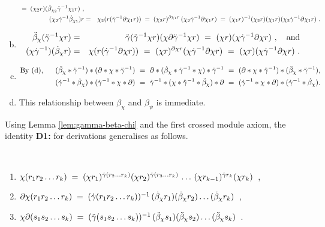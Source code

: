 \begin{pf}
\begin{enumerate}[(a)]
\begin{eqnarray*}
    \;=\; (\chi_2 r)(\ddot{\beta}_{\chi_2} \ddot{\gamma}^{-1} \chi_1 r)~, \\ 
(\chi_2 \dot{\gamma}^{-1} \dot{\beta}_{\chi_1})r
  & = & 
    \chi_2(r(\dot{\gamma}^{-1} \partial \chi_1 r))
  \;=\; (\chi_2 r)^{\partial\chi_1 r}\,(\chi_2 \dot{\gamma}^{-1} \partial \chi_1 r)
  \;=\; (\chi_1 r)^{-1}(\chi_2 r)(\chi_1 r)(\chi_2\dot{\gamma}^{-1}\partial\chi_1 r)~. 
\end{eqnarray*} 
\item
\mbox{}\vspace*{-9mm} 
\begin{eqnarray*}
\ddot{\beta}_{\chi}(\ddot{\gamma}^{-1}\chi r)
  &=& \ddot{\gamma}(\ddot{\gamma}^{-1}\chi r)(\chi\partial\ddot{\gamma}^{-1}\chi r) 
     ~=~ (\chi r)(\chi\dot{\gamma}^{-1}\partial\chi r)~, \quad \text{and} \\
(\chi\dot{\gamma}^{-1})(\dot{\beta}_{\chi}r) 
  &=& \chi(r(\dot{\gamma}^{-1}\partial\chi r)) 
     ~=~ (\chi r)^{\partial\chi r}(\chi\dot{\gamma}^{-1}\partial\chi r) 
     ~=~ (\chi r)(\chi\dot{\gamma}^{-1}\partial\chi r)~. 
\end{eqnarray*} 
\item
\mbox{}\vspace*{-9mm} 
\begin{eqnarray*} 
\text{By (d)},~~ 
  &&     (\ddot{\beta}_{\chi} * \ddot{\gamma}^{-1}) * (\partial * \chi * \ddot{\gamma}^{-1}) 
     ~=~ \partial * (\dot{\beta}_{\chi} * \dot{\gamma}^{-1} * \chi) * \ddot{\gamma}^{-1} 
     ~=~ (\partial * \chi * \ddot{\gamma}^{-1}) * (\ddot{\beta}_{\chi} * \ddot{\gamma}^{-1}), \\ 
  &&     (\dot{\gamma}^{-1} * \dot{\beta}_{\chi}) * (\dot{\gamma}^{-1} * \chi * \partial) 
     ~=~ \dot{\gamma}^{-1} * (\chi * \ddot{\gamma}^{-1} * \ddot{\beta}_{\chi}) * \partial 
     ~=~ (\dot{\gamma}^{-1} * \chi * \partial) * ( \dot{\gamma}^{-1} * \dot{\beta}_{\chi}). 
\end{eqnarray*} 
\item 
This relationship between $\beta_{\chi}$ and $\beta_{\psi}$ is immediate. 
\vspace*{-9mm} 
\end{enumerate} 
\end{pf}

\bigskip 
Using Lemma \ref{lem:gamma-beta-chi} and the first crossed module axiom,
the identity {\bf D1:} for derivations generalises as follows.
\begin{lem}
\mbox{  }\\
\vspace{-5mm}
\begin{enumerate}[{\rm (a)}]
\item\quad
$\chi(r_1r_2 \ldots r_k) \;=\;
(\chi r_1)^{\dot{\gamma}(r_2 \ldots r_k)}(\chi r_2)^{\dot{\gamma}(r_3 \ldots r_k)}
\,\ldots\,(\chi r_{k-1})^{\dot{\gamma} r_k}(\chi r_k)$~,
\item\quad
$\partial\chi(r_1r_2 \ldots r_k) \;=\;
(\dot{\gamma}(r_1r_2 \ldots r_k))^{-1}\,
(\dot{\beta}_{\chi}r_1)(\dot{\beta}_{\chi}r_2) \ldots (\dot{\beta}_{\chi}r_k)$~,
\item\quad
$\chi\partial(s_1s_2 \ldots s_k) \;=\;
(\ddot{\gamma}(s_1s_2 \ldots s_k))^{-1}\,
(\ddot{\beta}_{\chi}s_1)(\ddot{\beta}_{\chi}s_2) \ldots (\ddot{\beta}_{\chi}s_k)$~.
\end{enumerate}
\end{lem}

